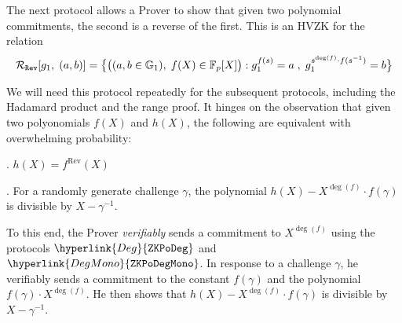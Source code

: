 \documentclass[11pt, lettersize, notitlepage, leqno, footskip=0.6cm]{article}
\newcommand{\bFp}{\mathbb{F}_p}
\newcommand{\mc}{\mathcal}
\newcommand{\mb}{\mathbb}
\newcommand{\mr}{\mathrm}
\newcommand{\noin}{\noindent}
\newcommand{\op}{overwhelming probability}
\numberwithin{equation}{section}
\begin{document}
The next protocol allows a Prover to show that given two polynomial commitments, the second is a reverse of the first. This is an HVZK for the relation  $$\mc{R}_{\tt{Rev}}[g_1,\;(a,b)] = \big\{\big((a,b\in\mb{G}_1),\; f(X)\in \bFp[X]\big): g_1^{f(s)} = a\;,\; g_1^{s^{\deg(f)}\cdot f(s^{-1})} = b\big\}  $$

We will need this protocol repeatedly for the subsequent protocols, including the Hadamard product and the range proof. It hinges on the observation that given two polyonomials $f(X)$ and $h(X)$, the following are equivalent with \op: \vspace{2mm}

\noin 1. $h(X) = f^{\mr{Rev}}(X)$ \vspace{1mm}

\noin 2. For a randomly generate challenge $\gamma$, the polynomial $h(X) - X^{\deg(f)}\cdot f(\gamma)$ is divisible by $X-\gamma^{-1}$. \vspace{2mm}

To this end, the Prover \textit{verifiably} sends a commitment to $X^{\deg(f)}$ using the protocols $\hyperlink{Deg}{\tt{ZKPoDeg}}$ and $\hyperlink{DegMono}{\tt{ZKPoDegMono}}$. In response to a challenge $\gamma$, he verifiably sends a commitment to the constant $f(\gamma)$ and the polynomial $f(\gamma)\cdot X^{\deg(f)}$. He then shows that $h(X) - X^{\deg(f)}\cdot f(\gamma)$ is divisible by $X-\gamma^{-1}$.










\bigskip
\end{document}
